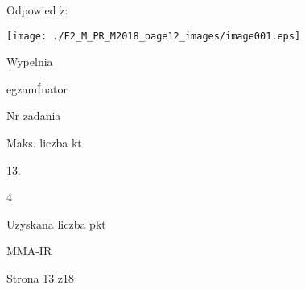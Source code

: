 \documentclass[a4paper,12pt]{article}
\begin{document}
Odpowied $\acute{\mathrm{z}}$:
\begin{center}
\texttt{[image: ./F2\_M\_PR\_M2018\_page12\_images/image001.eps]}
\end{center}
Wypelnia

egzamÍnator

Nr zadania

Maks. liczba kt

13.

4

Uzyskana liczba pkt

MMA-IR

Strona 13 z18
\end{document}
